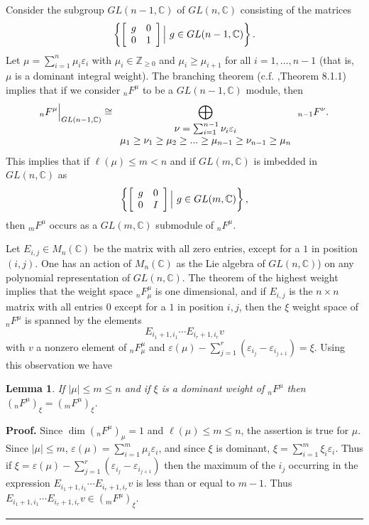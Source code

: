 \documentclass[12pt]{article}%
\newtheorem{lemma}[theorem]{Lemma}
\newenvironment{proof}[1][Proof]{\noindent\textbf{#1.} }{\ \rule{0.5em}{0.5em}}
\begin{document}
Consider the subgroup $GL(n-1,\mathbb{C})$ of $GL(n,\mathbb{C})$ consisting of
the matrices%
\[
\left\{  \left[
\begin{array}
[c]{cc}%
g & 0\\
0 & 1
\end{array}
\right]  \Big| ~g\in GL(n-1,\mathbb{C})\right\}  .
\]
Let $\mu=\sum_{i=1}^{n}\mu_{i}\varepsilon_{i}$ with $\mu_{i}\in\mathbb{Z}%
_{\geq0}$ and $\mu_{i}\geq\mu_{i+1}$ for all $i=1,\dots,n-1$ (that is, $\mu$ is
a dominant integral weight). The branching theorem (c.f. \cite{GW},Theorem
8.1.1) implies that if we consider ${}_{n}F^{\mu}$ to be a $GL(n-1,\mathbb{C}%
){}$ module, then
\[
{}_{n}F^{\mu}\Big|_{ GL(n-1,\mathbb{C})} \cong\bigoplus_{%
\begin{array}
[c]{c}%
\nu=\sum_{i=1}^{n-1}\nu_{i}\varepsilon_{i}\\
\mu_{1}\geq\nu_{1}\geq\mu_{2}\geq...\geq\mu_{n-1}\geq\nu_{n-1}\geq\mu_{n}%
\end{array}
}{}_{n-1}F^{\nu}.
\]
This implies that if $\ell(\mu)\leq m<n$ and if $GL(m,\mathbb{C})$ is imbedded
in $GL(n,\mathbb{C})$ as%
\[
\left\{  \left[
\begin{array}
[c]{cc}%
g & 0\\
0 & I
\end{array}
\right]  \Big|~ g\in GL(m,\mathbb{C})\right\}  ,
\]
then ${}_{m}F^{\mu}$ occurs as a $GL(m,\mathbb{C})$ submodule of ${}_{n}%
F^{\mu}$.

Let $E_{i,j}\in M_{n}(\mathbb{C})$ be the matrix with all zero entries, except
for a $1$ in position $(i,j)$. One has an action of $M_{n}(\mathbb{C})$ as the
Lie algebra of $GL(n,\mathbb{C})$) on any polynomial representation of
$GL(n,\mathbb{C})$. The theorem of the highest weight implies that the weight
space ${}_{n}F_{\mu}^{\mu}$ is one dimensional, and if $E_{i,j}$ is the
$n\times n$ matrix with all entries $0$ except for a $1$ in position $i,j$,
then the $\xi$ weight space of ${}_{n}F^{\mu}$ is spanned by the elements%
\[
E_{i_{1}+1,i_{1}}\cdots E_{i_{r}+1,i_{r}}v
\]
with $v$ a nonzero element of ${}_{n}F_{\mu}^{\mu}$ and $\varepsilon(\mu
)-\sum_{j=1}^{r}(\varepsilon_{i_{j}}-\varepsilon_{i_{j+1}})=\xi$. Using this
observation we have

\begin{lemma}
\label{lemma2} If $\left\vert \mu\right\vert \leq m\leq n$ and if $\xi$ is a
dominant weight of ${}_{n}F^{\mu}$ then $({}_{n}F^{\mu})_{\xi}=({}_{m}F^{\mu
})_{\xi}$.
\end{lemma}

\begin{proof}
Since $\dim({}_{n}F^{\mu})_{\mu}=1$ and $\ell(\mu) \leq m \leq n$, the
assertion is true for $\mu$. Since $\left\vert \mu\right\vert \leq m$,
$\varepsilon(\mu)=\sum_{i=1}^{m}\mu_{i}\varepsilon_{i}$, and since $\xi$ is
dominant, $\xi=\sum_{i=1}^{m}\xi_{i}\varepsilon_{i}.$ Thus if $\xi
=\varepsilon(\mu)-\sum_{j=1}^{r}(\varepsilon_{i_{j}}-\varepsilon_{i_{j+1}})$
then the maximum of the $i_{j}$ occurring in the expression $E_{i_{1}+1,i_{1}%
}\cdots E_{i_{r}+1,i_{r}}v$ is less than or equal to $m-1$. Thus
$E_{i_{1}+1,i_{1}}\cdots E_{i_{r}+1,i_{r}}v\in({}_{m}F^{\mu})_{\xi}$.
\end{proof}
\end{document}
